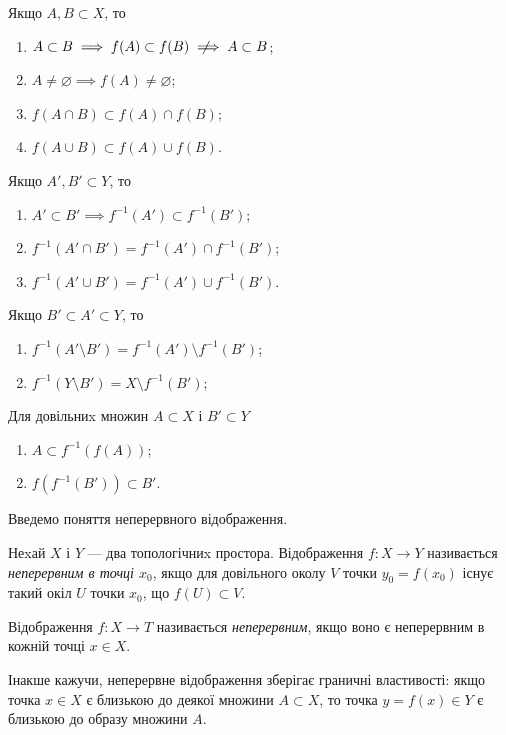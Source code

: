 \documentclass[a4paper, 12pt]{article}
\renewcommand{\emptyset}{\varnothing}
\newcommand{\notimplies}{\mathrel{{\ooalign{\hidewidth$\not\phantom{=}$\hidewidth\cr$\implies$}}}}
\begin{document}
Якщо $A, B \subset X$, то
\begin{enumerate}
	\item $A \subset B \implies f(A) \subset f(B) \notimplies A \subset B$; 
	\item $A \ne \emptyset \implies f(A) \ne \emptyset$;
	\item $f(A \cap B) \subset f(A) \cap f(B)$;
	\item $f(A \cup B) \subset f(A) \cup f(B)$.
\end{enumerate}
Якщо $A', B' \subset Y$, то
\begin{enumerate}
	\item $A' \subset B' \implies f^{-1} (A') \subset f^{-1} (B')$;
	\item $f^{-1} (A' \cap B') = f^{-1}(A') \cap f^{-1}(B')$;
	\item $f^{-1} (A' \cup B') = f^{-1}(A') \cup f^{-1}(B')$.
\end{enumerate}
Якщо $B' \subset A' \subset Y$, то
\begin{enumerate}
	\item $f^{-1} (A' \setminus B') = f^{-1}(A') \setminus f^{-1}(B')$;
	\item $f^{-1} (Y \setminus B') = X \setminus f^{-1}(B')$;
\end{enumerate}
Для довільниx множин $A \subset X$ і $B' \subset Y$
\begin{enumerate}
	\item $A \subset f^{-1} (f(A))$;
	\item $f(f^{-1}(B')) \subset B'$.
\end{enumerate}

Введемо поняття неперервного відображення.

\begin{definition}
	Неxай $X$ і $Y$ --- два топологічниx простора.
	Відображення $f: X \to Y$ називається \textit{неперервним в
	точці $x_0$}, якщо для довільного околу $V$ точки $y_0 = f(x_0)$
	існує такий окіл $U$ точки $x_0$, що $f(U) \subset V$.
\end{definition}

\begin{definition}
	Відображення $f: X \to T$ називається \textit{неперервним}, 
	якщо воно є неперервним в кожній точці $x \in X$.
\end{definition}

Інакше кажучи, неперервне відображення зберігає
граничні властивості: якщо точка $x \in X$ є близькою до
деякої множини $A \subset X$, то точка $y = f(x) \in Y$ є близькою
до образу множини $A$.
\end{document}
